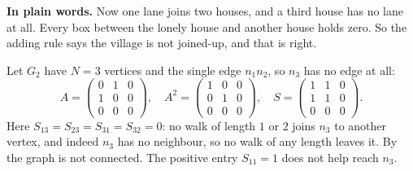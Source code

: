 \plainstart\textbf{In plain words.} Now one lane joins two houses, and a third house has no lane at all. Every box between the lonely house and another house holds zero. So the adding rule says the village is not joined-up, and that is right.\plainend
\begin{example}\label{ex:test2}
Let $G_2$ have $N = 3$ vertices and the single edge $n_1n_2$, so $n_3$ has no edge at all:
\[
A = \begin{pmatrix} 0&1&0\\ 1&0&0\\ 0&0&0 \end{pmatrix},\quad
A^2 = \begin{pmatrix} 1&0&0\\ 0&1&0\\ 0&0&0 \end{pmatrix},\quad
S = \begin{pmatrix} 1&1&0\\ 1&1&0\\ 0&0&0 \end{pmatrix}.
\]
Here $S_{13} = S_{23} = S_{31} = S_{32} = 0$: no walk of length $1$ or $2$ joins $n_3$ to another vertex, and indeed $n_3$ has no neighbour, so no walk of any length leaves it. By  the graph is not connected. The positive entry $S_{11} = 1$ does not help reach $n_3$.
\end{example}
